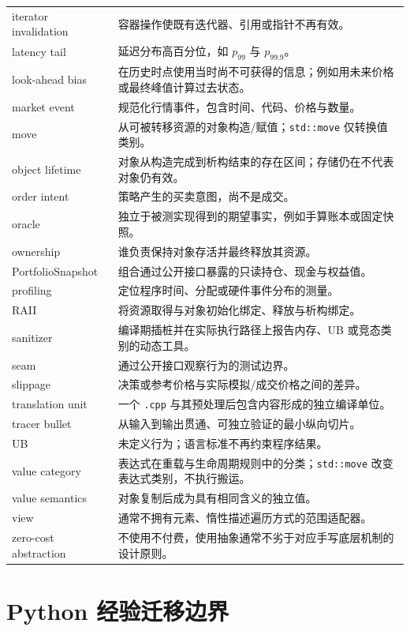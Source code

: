\begin{longtable}{p{}p{}}
iterator invalidation & 容器操作使既有迭代器、引用或指针不再有效。\\
latency tail & 延迟分布高百分位，如 \(p_{99}\) 与 \(p_{99.9}\)。\\
look-ahead bias & 在历史时点使用当时尚不可获得的信息；例如用未来价格或最终峰值计算过去状态。\\
market event & 规范化行情事件，包含时间、代码、价格与数量。\\
move & 从可被转移资源的对象构造/赋值；\texttt{std::move} 仅转换值类别。\\
object lifetime & 对象从构造完成到析构结束的存在区间；存储仍在不代表对象仍有效。\\
order intent & 策略产生的买卖意图，尚不是成交。\\
oracle & 独立于被测实现得到的期望事实，例如手算账本或固定快照。\\
ownership & 谁负责保持对象存活并最终释放其资源。\\
PortfolioSnapshot & 组合通过公开接口暴露的只读持仓、现金与权益值。\\
profiling & 定位程序时间、分配或硬件事件分布的测量。\\
RAII & 将资源取得与对象初始化绑定、释放与析构绑定。\\
sanitizer & 编译期插桩并在实际执行路径上报告内存、UB 或竞态类别的动态工具。\\
seam & 通过公开接口观察行为的测试边界。\\
slippage & 决策或参考价格与实际模拟/成交价格之间的差异。\\
translation unit & 一个 \texttt{.cpp} 与其预处理后包含内容形成的独立编译单位。\\
tracer bullet & 从输入到输出贯通、可独立验证的最小纵向切片。\\
UB & 未定义行为；语言标准不再约束程序结果。\\
value category & 表达式在重载与生命周期规则中的分类；\texttt{std::move} 改变表达式类别，不执行搬运。\\
value semantics & 对象复制后成为具有相同含义的独立值。\\
view & 通常不拥有元素、惰性描述遍历方式的范围适配器。\\
zero-cost abstraction & 不使用不付费，使用抽象通常不劣于对应手写底层机制的设计原则。\\
\bottomrule
\end{longtable}

\section{Python 经验迁移边界}

